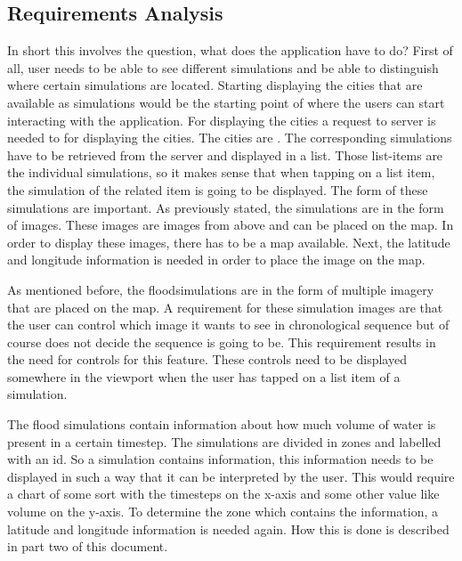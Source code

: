 \vspace{1cm}
\subsection{Requirements Analysis}
\label{sec:requirements}
In short this involves the question, what does the application have to do? First of all, user needs to be able to see different simulations and be able to distinguish where certain simulations are located. Starting displaying the cities that are available as simulations would be the starting point of where the users can start interacting with the application. For displaying the cities a request to server is needed to  for displaying the cities. 
The cities are . The corresponding simulations have to be retrieved from the server and displayed in a list. Those list-items are the individual simulations, so it makes sense that when tapping on a list item, the simulation of the related item is going to be displayed. The form of these simulations are important. As previously stated, the simulations are in the form of images. These images are images from above and can be placed on the map. In order to display these images, there has to be a map available. Next, the latitude and longitude information is needed in order to place the image on the map.

As mentioned before, the floodsimulations are in the form of multiple imagery that are placed on the map. A requirement for these simulation images are that the user can control which image it wants to see in chronological sequence but of course does not decide the sequence is going to be. This requirement results in the need for controls for this feature. These controls need to be displayed somewhere in the viewport when the user has tapped on a list item of a simulation.

The flood simulations contain information about how much volume of water is present in a certain timestep. The simulations are divided in zones and labelled with an id. So a simulation contains information, this information needs to be displayed in such a way that it can be interpreted by the user. This would require a chart of some sort with the timesteps on the x-axis and some other value like volume on the y-axis. To determine the zone which contains the information, a latitude and longitude information is needed again. How this is done is described in part two of this document.


